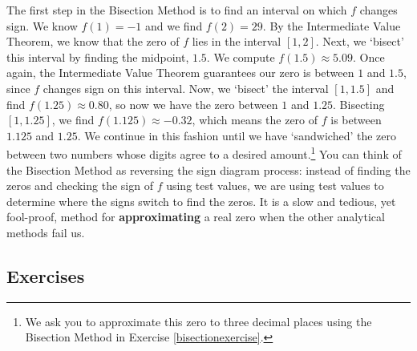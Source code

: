 \documentclass{ximera}
\begin{document}
\label{bisectionmethod}

The first step in the Bisection Method is to find an interval on which $f$ changes sign.  We know $f(1) = -1$ and we find $f(2) = 29$.  By the Intermediate Value Theorem, we know that the zero of $f$ lies in the interval $[1,2]$.  Next, we `bisect' this interval by finding the midpoint,  $1.5$.  We compute  $f(1.5)\approx 5.09$.  Once again, the Intermediate Value Theorem guarantees our zero is between $1$ and $1.5$, since $f$ changes sign on this interval.  Now, we `bisect' the interval $[1,1.5]$ and find $f(1.25) \approx 0.80$, so now we have the zero between $1$ and $1.25$.  Bisecting $[1,1.25]$, we find $f(1.125) \approx -0.32$, which means the zero of $f$ is between $1.125$ and $1.25$.  We continue in this fashion until we have `sandwiched' the zero between two numbers whose digits agree to a desired amount.\footnote{We ask you to approximate this zero to three decimal places using the Bisection Method  in Exercise \ref{bisectionexercise}.} You can think of the Bisection Method as reversing the sign diagram process:  instead of finding the zeros and checking the sign of $f$ using test values, we are using test values to determine where the signs switch to find the zeros.  It is a slow and tedious, yet fool-proof, method for \textbf{approximating} a real zero when the other analytical methods fail us.  


\newpage

\subsection{Exercises}


\closegraphsfile
\end{document}
